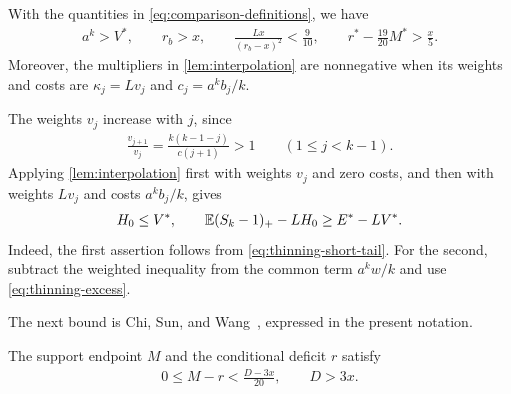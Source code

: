 \begin{lemma}\label{lem:comparison-estimates}
With the quantities in \cref{eq:comparison-definitions}, we have
\begin{align}
 a^k>V^*,\qquad
 r_b>x,\qquad
 \frac{Lx}{(r_b-x)^2}<\frac9{10},\qquad
 r^*-\frac{19}{20}M^*>\frac x5.
 \label{eq:comparison-bounds}
\end{align}
Moreover, the multipliers in \cref{lem:interpolation} are nonnegative when its weights and costs are
$\kappa_j=Lv_j$ and $c_j=a^kb_j/k$.
\end{lemma}

The weights $v_j$ increase with $j$, since
\begin{align*}
 \frac{v_{j+1}}{v_j}=\frac{k(k-1-j)}{c(j+1)}>1
 \qquad(1\le j<k-1).
\end{align*}
Applying \cref{lem:interpolation} first with weights $v_j$ and zero costs, and then with weights $Lv_j$ and costs $a^kb_j/k$, gives
\begin{align}
 H_0\le V^*,
 \qquad
 \mathbb E(S_k-1)_+-LH_0\ge E^*-LV^*.
 \label{eq:actual-interpolated-comparison}
\end{align}
Indeed, the first assertion follows from \cref{eq:thinning-short-tail}.
For the second, subtract the weighted inequality from the common term $a^kw/k$ and use \cref{eq:thinning-excess}.

The next bound is Chi, Sun, and Wang~\cite[Lemma 4.4]{CSW2026}, expressed in the present notation.
\begin{lemma}\label{lem:mean-deficit}
The support endpoint $M$ and the conditional deficit $r$ satisfy
\begin{align}
 0\le M-r<\frac{D-3x}{20},
 \qquad D>3x.
 \label{eq:mean-deficit-proximity}
\end{align}
\end{lemma}

